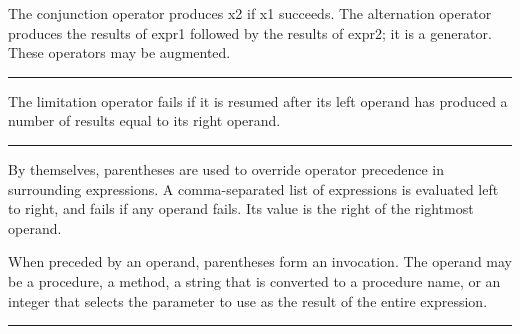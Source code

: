 \noindent
The conjunction operator produces \textsf{x2} if
\textsf{x1} succeeds. The alternation operator produces the results of \textsf{expr1} followed
by the results of \textsf{expr2}; it is a generator.
These operators may be augmented.

\bigskip\hrule\vspace{0.1cm}

\noindent
The limitation operator fails if it
is resumed after its left operand has produced a number of results
equal to its right operand.

\bigskip\hrule\vspace{0.1cm}


\noindent
By themselves, parentheses are used
to override operator precedence in surrounding expressions. A
comma-separated list of expressions is evaluated left to right, and
fails if any operand fails. Its value is the right of the rightmost
operand.

When preceded by an operand, parentheses form an invocation. The operand may be a procedure, a method, a
string that is converted to a procedure name, or an integer that
selects the parameter to use as the result of the entire expression.

\bigskip\hrule\vspace{0.1cm}







